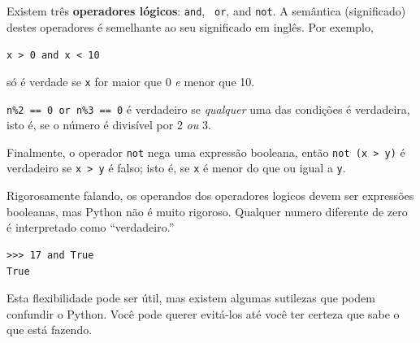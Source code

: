 Existem três {\bf operadores lógicos}: {\tt and}, {\tt
or}, and {\tt not}. A semântica (significado) destes operadores é
semelhante ao seu significado em inglês. Por exemplo,


{\tt x > 0 and x < 10} 

só é verdade se {\tt x} for maior que 0
\emph{e} menor que 10.




{\tt n\%2 == 0 or n\%3 == 0} é verdadeiro se \emph{qualquer} uma das condições
é verdadeira, isto é, se o número é divisível por 2 \emph{ou} 3.


Finalmente, o operador {\tt not} nega uma expressão
booleana, então {\tt not (x > y)} é verdadeiro se {\tt x > y} é falso;
isto é, se {\tt x} é menor do que ou igual a {\tt y}.


Rigorosamente falando, os operandos dos operadores logicos devem ser
expressões booleanas, mas Python não é muito rigoroso.
Qualquer numero diferente de zero é interpretado como ``verdadeiro.''


\beforeverb
\begin{verbatim}
>>> 17 and True
True
\end{verbatim}
\afterverb
%
Esta flexibilidade pode ser útil, mas existem algumas sutilezas que
podem confundir o Python. Você pode querer evitá-los até
você ter certeza que sabe o que está fazendo.

